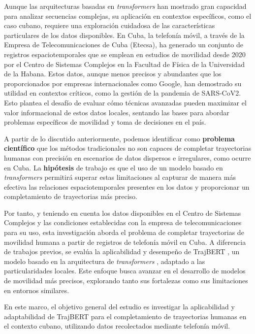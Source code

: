 Aunque las arquitecturas basadas en \textit{transformers} han mostrado gran capacidad para analizar secuencias complejas, su aplicación en contextos específicos, como el caso cubano, requiere una exploración cuidadosa de las características particulares de los datos disponibles. En Cuba, la telefonía móvil, a través de la Empresa de Telecomunicaciones de Cuba (Etecsa), ha generado un conjunto de registros espaciotemporales que se emplean en estudios de movilidad desde 2020 por el Centro de Sistemas Complejos en la Facultad de Física de la Universidad de la Habana. Estos datos, aunque menos precisos y abundantes que los proporcionados por empresas internacionales como Google, han demostrado su utilidad en contextos críticos, como la gestión de la pandemia de SARS-CoV2. Esto plantea el desafío de evaluar cómo técnicas avanzadas pueden maximizar el valor informacional de estos datos locales, sentando las bases para abordar problemas específicos de movilidad y toma de decisiones en el país.

A partir de lo discutido anteriormente, podemos identificar como \textbf{problema científico} que los métodos tradicionales no son capaces de completar trayectorias humanas con precisión en escenarios de datos dispersos e irregulares, como ocurre en Cuba. La \textbf{hipótesis} de trabajo es que el uso de un modelo basado en \textit{transformers} permitirá superar estas limitaciones al capturar de manera más efectiva las relaciones espaciotemporales presentes en los datos y proporcionar un completamiento de trayectorias más preciso.

Por tanto, y teniendo en cuenta los datos disponibles en el Centro de Sistemas Complejos y las condiciones establecidas con la empresa de telecomunicaciones para su uso, esta investigación aborda el problema de completar trayectorias de movilidad humana a partir de registros de telefonía móvil en Cuba. A diferencia de trabajos previos, se evalúa la aplicabilidad y desempeño de TrajBERT \cite{si2023trajbert}, un modelo basado en la arquitectura de \textit{transformers} , adaptado a las particularidades locales. Este enfoque busca avanzar en el desarrollo de modelos de movilidad más precisos, explorando tanto sus fortalezas como sus limitaciones en entornos similares.

En este marco, el objetivo general del estudio es investigar la aplicabilidad y adaptabilidad de TrajBERT para el completamiento de trayectorias humanas en el contexto cubano, utilizando datos recolectados mediante telefonía móvil.

